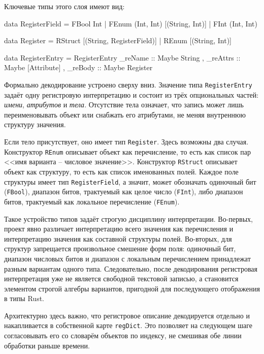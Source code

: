 \documentclass[a4paper,12pt]{article}
\begin{document}
Ключевые типы этого слоя имеют вид:

\begin{flushleft}
\label{lst:register-types}
\begin{MyCodes}
data RegisterField
  = FBool Int
  | FEnum (Int, Int) [(String, Int)]
  | FInt (Int, Int)

data Register
  = RStruct [(String, RegisterField)]
  | REnum [(String, Int)]

data RegisterEntry = RegisterEntry
  { _reName  :: Maybe String
  , _reAttrs :: Maybe [Attribute]
  , _reBody  :: Maybe Register
  }
\end{MyCodes}
\end{flushleft}

Формально декодирование устроено сверху вниз. Значение типа \texttt{RegisterEntry}
задаёт одну регистровую интерпретацию и состоит из трёх опциональных частей:
\textit{имени}, \textit{атрибутов} и \textit{тела}. Отсутствие тела означает, что запись
может лишь переименовывать объект или снабжать его атрибутами, не меняя внутреннюю
структуру значения.

Если тело присутствует, оно имеет тип \texttt{Register}. Здесь возможны два случая.
Конструктор \texttt{REnum} описывает объект как перечисление, то есть как список пар
<<имя варианта -- числовое значение>>. Конструктор \texttt{RStruct} описывает объект как
структуру, то есть как список именованных полей. Каждое поле структуры имеет тип
\texttt{RegisterField}, а значит, может обозначать одиночный бит
(\texttt{FBool}), диапазон битов, трактуемый как целое число (\texttt{FInt}), либо
диапазон битов, трактуемый как локальное перечисление (\texttt{FEnum}).

Такое устройство типов задаёт строгую дисциплину интерпретации. Во-первых, проект
явно различает интерпретацию всего значения как перечисления и интерпретацию значения
как составной структуры полей. Во-вторых, для структур запрещается произвольное
смешение форм поля: одиночный бит, диапазон числовых битов и диапазон с локальным
перечислением принадлежат разным вариантам одного типа. Следовательно, после
декодирования регистровая интерпретация уже не является свободной текстовой записью, а
становится элементом строгой алгебры вариантов, пригодной для последующего отображения
в типы Rust.

Архитектурно здесь важно, что регистровое описание декодируется отдельно и
накапливается в собственной карте \texttt{regDict}. Это позволяет на следующем шаге
согласовывать его со словарём объектов по индексу, не смешивая обе линии обработки
раньше времени.
\end{document}
